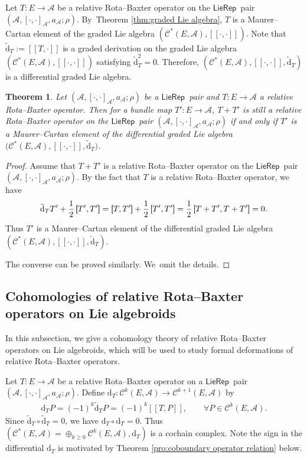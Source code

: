 \documentclass[pdftex]{sigma}%
\numberwithin{equation}{section}
\newtheorem{thm}{Theorem}[section]
\newcommand{\huaA}{\mathcal{A}}
\newcommand{\huaC}{\mathcal{C}}
\newcommand{\Courant}[1]{\left[\!\left[ #1\right]\!\right]}
\newcommand{\Courantt}[1]{\left[\hspace*{-3pt}\left[ #1\right]\hspace*{-3pt}\right]}
\newcommand{\half}{\frac{1}{2}}
\newcommand{\dM}{\mathrm{d}}
\newcommand{\LP}{$\mathsf{LieRep}$~}
\begin{document}
Let $T\colon E\longrightarrow \huaA$ be a relative Rota--Baxter operator on the \LP pair $(\huaA,[\cdot,\cdot]_\huaA,a_\huaA;\rho)$. By~Theorem \ref{thm:graded Lie algebra}, $T$ is a Maurer--Cartan element of the graded Lie algebra $(\huaC^*(E,\huaA),\Courant{\cdot,\cdot})$. Note that $\tilde{\dM}_T:=\Courant{T,\cdot}$ is a graded derivation on the graded Lie algebra $(\huaC^*(E,\huaA),\Courant{\cdot,\cdot})$ satisfying $\tilde{\dM}_T^2=0$. Therefore, $(\huaC^*(E,\huaA),\Courant{\cdot,\cdot},\tilde{\dM}_T)$ is a differential graded Lie algebra.
\begin{thm}
Let $(\huaA,[\cdot,\cdot]_\huaA,a_\huaA;\rho)$ be a \LP pair and $T\colon E\longrightarrow \huaA$ a relative Rota--Baxter operator. Then for a bundle map $T'\colon E\longrightarrow \huaA$, $T+T'$ is still a relative Rota--Baxter operator on the \LP pair $(\huaA,[\cdot,\cdot]_\huaA,a_\huaA;\rho)$ if and only if $T'$ is a Maurer--Cartan element of the differential graded Lie algebra $\big(\huaC^*(E,\huaA),\Courant{\cdot,\cdot},\tilde{\dM}_T\big)$.
\end{thm}

\begin{proof}
{\sloppy	Assume that $T+T'$ is a relative Rota--Baxter operator on the \LP pair $(\huaA,[\cdot,\cdot]_\huaA,a_\huaA;\rho)$. By the fact that $T$ is a relative Rota--Baxter operator, we have
	\begin{gather*}
	\tilde{\dM}_T T'+\half\Courantt{T',T'}=\Courantt{T,T'}+\half\Courantt{T',T'}
	=\half\Courantt{T+T',T+T'}=0.
		\end{gather*}}\noindent
		Thus $T'$ is a Maurer--Cartan element of the differential graded Lie algebra $(\huaC^*(E,\huaA),\Courant{\cdot,\cdot},\tilde{\dM}_T)$.
		
The converse can be proved similarly. We~omit the details.
\end{proof}

\subsection{Cohomologies of relative Rota--Baxter operators on Lie algebroids}
In this subsection, we give a cohomology theory of relative Rota--Baxter operators on Lie algebroids, which will be used to study formal deformations of relative Rota--Baxter operators.

Let $T\colon E\longrightarrow \huaA$ be a relative Rota--Baxter operator on a \LP pair $(\huaA,[\cdot,\cdot]_\huaA,a_\huaA;\rho)$. Define $\dM_{T}\colon \huaC^k(E,\huaA)\rightarrow \huaC^{k+1}(E,\huaA)$ by
\begin{gather*}
\dM_{T}P=(-1)^{k}\tilde{\dM}_T P=(-1)^{k}\Courant{T,P},\qquad \forall P\in \huaC^k(E,\huaA).
\end{gather*}
Since $\tilde{\dM}_T\circ\tilde{\dM}_T=0 $, we have $\dM_{T}\circ \dM_{T}=0$. Thus $(\huaC^*(E,\huaA)=\oplus_{k\geq0}\huaC^k(E,\huaA),\dM_{T})$ is a cochain complex. Note the sign in the differential $\dM_T$ is motivated by Theorem \ref{pro:coboundary operator relation} below.
\end{document}
